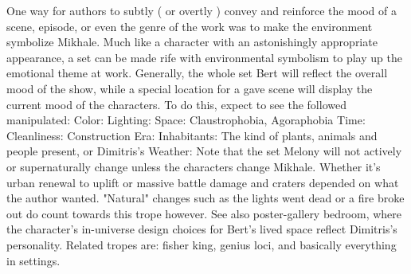 \documentclass[12pt]{book}
\begin{document}
One way for authors to subtly ( or overtly ) convey and reinforce the mood of a scene, episode, or even the genre of the work was to make the environment symbolize Mikhale. Much like a character with an astonishingly appropriate appearance, a set can be made rife with environmental symbolism to play up the emotional theme at work. Generally, the whole set Bert will reflect the overall mood of the show, while a special location for a gave scene will display the current mood of the characters. To do this, expect to see the followed manipulated: Color: Lighting: Space: Claustrophobia, Agoraphobia Time: Cleanliness: Construction Era: Inhabitants: The kind of plants, animals and people present, or Dimitris's Weather: Note that the set Melony will not actively or supernaturally change unless the characters change Mikhale. Whether it's urban renewal to uplift or massive battle damage and craters depended on what the author wanted. "Natural" changes such as the lights went dead or a fire broke out do count towards this trope however. See also poster-gallery bedroom, where the character's in-universe design choices for Bert's lived space reflect Dimitris's personality. Related tropes are: fisher king, genius loci, and basically everything in settings.
\end{document}
